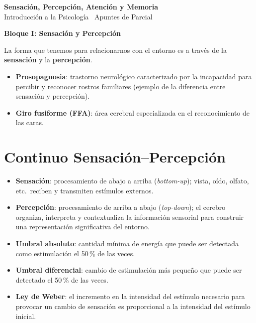 \documentclass[11pt,a4paper]{article}
\begin{document}
\begin{tcolorbox}[
  colback=Primary,
  colframe=Primary,
  arc=4pt,
  left=14pt, right=14pt, top=12pt, bottom=12pt,
  boxrule=0pt
]
  {\color{white}\Huge\bfseries Sensación, Percepción, Atención y Memoria}\\[0.35em]
  {\color{SoftBg}\large Introducción a la Psicología \textbullet\ Apuntes de Parcial}
\end{tcolorbox}

\vspace{0.6em}
\begin{tcolorbox}[colback=SoftBg,colframe=Primary,arc=3pt,left=10pt,right=10pt,top=6pt,bottom=6pt,boxrule=0.8pt]
  {\large\bfseries\color{Primary} Bloque I: Sensación y Percepción}
\end{tcolorbox}

\vspace{0.3em}
\noindent La forma que tenemos para relacionarnos con el entorno es a través de la \textbf{sensación} y la \textbf{percepción}.

\begin{itemize}
  \item \textbf{Prosopagnosia}: trastorno neurológico caracterizado por la incapacidad para percibir y reconocer rostros familiares (ejemplo de la diferencia entre sensación y percepción).
  \item \textbf{Giro fusiforme (FFA)}: área cerebral especializada en el reconocimiento de las caras.
\end{itemize}

\section{Continuo Sensación--Percepción}

\begin{itemize}
  \item \textbf{Sensación}: procesamiento de abajo a arriba (\emph{bottom-up}); vista, oído, olfato, etc.\ reciben y transmiten estímulos externos.
  \item \textbf{Percepción}: procesamiento de arriba a abajo (\emph{top-down}); el cerebro organiza, interpreta y contextualiza la información sensorial para construir una representación significativa del entorno.
  \item \textbf{Umbral absoluto}: cantidad mínima de energía que puede ser detectada como estimulación el 50\,\% de las veces.
  \item \textbf{Umbral diferencial}: cambio de estimulación más pequeño que puede ser detectado el 50\,\% de las veces.
  \item \textbf{Ley de Weber}: el incremento en la intensidad del estímulo necesario para provocar un cambio de sensación es proporcional a la intensidad del estímulo inicial.
\end{itemize}
\end{document}
